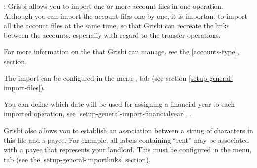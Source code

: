 \Note{}: Grisbi allows you to import one or more account files in one operation. Although you can import the account files one by one, it is important to import all the account files at the same time, so that Grisbi can recreate the links between the accounts, especially with regard to the transfer operations.

For more information on the  that Grisbi can manage, see the \vref{accounts-type},  section.

The import can be configured in the menu ,  tab (see section \vref{setup-general-import-files}).

You can define which date will be used for assigning a financial year to each imported operation, see \vref{setup-general-import-financialyear}, .

Grisbi also allows you to establish an association between a string of characters in this file and a payee. For example, all labels containing \enquote{rent} may be associated with a payee that represents your landlord. This must be configured in the  menu,  tab (see the \vref{setup-general-importlinks} section).

